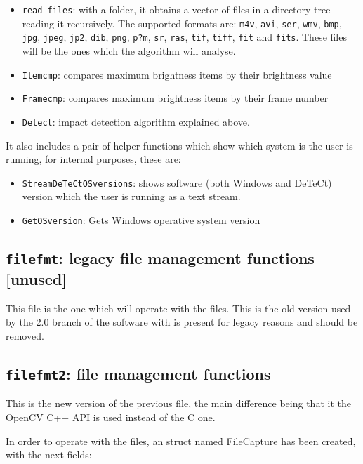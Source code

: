 \documentclass[a4paper,11pt]{memoir}
\begin{document}
\begin{itemize}
\item \texttt{read\_files}: with a folder, it obtains a vector of files in a directory tree reading it
recursively. The supported formats are: \texttt{m4v}, \texttt{avi}, \texttt{ser}, \texttt{wmv}, \texttt{bmp}, \texttt{jpg},
\texttt{jpeg}, \texttt{jp2}, \texttt{dib}, \texttt{png}, \texttt{p?m}, \texttt{sr}, \texttt{ras}, \texttt{tif}, \texttt{tiff}, \texttt{fit} and \texttt{fits}. These files will be the ones which the algorithm will analyse.
\item \texttt{Itemcmp}: compares maximum brightness items by their brightness value
\item \texttt{Framecmp}: compares maximum brightness items by their frame number
\item \texttt{Detect}: impact detection algorithm explained above.
\end{itemize}

It also includes a pair of helper functions which show which system is the user is running, for internal purposes, these are:
\begin{itemize}
\item \texttt{StreamDeTeCtOSversions}: shows software (both Windows and DeTeCt) version
which the user is running as a text stream.
\item \texttt{GetOSversion}: Gets Windows operative system version
\end{itemize}

\subsection{\texttt{filefmt}: legacy file management functions [unused]}

This file is the one which will operate with the files. This is the old version used by the 2.0 branch of the software with is present for legacy reasons and should be removed.

\subsection{\texttt{filefmt2}: file management functions}

This is the new version of the previous file, the main difference being that it the OpenCV C++ API is used instead of the C one.

In order to operate with the files, an struct named FileCapture has been created, with the next fields:
\end{document}
